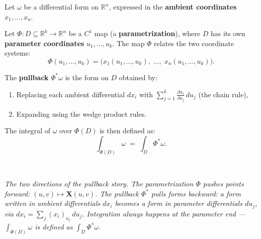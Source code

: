 \documentclass[11pt]{report}
\newcommand{\figcap}[1]{\\[1.5mm]\parbox{0.92\textwidth}{\small\itshape #1}}
\newcommand{\R}{\mathbb{R}}
\newcommand{\parti}[2]{\frac{\partial #1}{\partial #2}}
\begin{document}
\begin{definition}[Pullback]
Let $\omega$ be a differential form on $\R^n$, expressed in the \textbf{ambient coordinates} $x_1, \ldots, x_n$.

Let $\Phi: D \subseteq \R^k \to \R^n$ be a $C^1$ map (a \textbf{parametrization}), where $D$ has its own \textbf{parameter coordinates} $u_1, \ldots, u_k$. The map $\Phi$ relates the two coordinate systems:
\[
\Phi(u_1, \ldots, u_k) = \big(x_1(u_1, \ldots, u_k),\; \ldots,\; x_n(u_1, \ldots, u_k)\big).
\]

The \textbf{pullback} $\Phi^*\omega$ is the form on $D$ obtained by:
\begin{enumerate}
    \item Replacing each ambient differential $dx_i$ with $\displaystyle\sum_{j=1}^k \parti{x_i}{u_j}\,du_j$ (the chain rule),
    \item Expanding using the wedge product rules.
\end{enumerate}

The integral of $\omega$ over $\Phi(D)$ is then defined as:
\[
\int_{\Phi(D)} \omega \;=\; \int_D \Phi^*\omega.
\]
\end{definition}

\begin{center}
%
\figcap{The two directions of the pullback story. The parametrization $\Phi$ pushes points forward: $(u,v) \mapsto \mathbf{X}(u,v)$. The pullback $\Phi^*$ pulls forms backward: a form written in ambient differentials $dx_i$ becomes a form in parameter differentials $du_j$, via $dx_i = \sum_j (x_i)_{u_j}\,du_j$. Integration always happens at the parameter end --- $\int_{\Phi(D)}\omega$ is \textnormal{defined} as $\int_D \Phi^*\omega$.}
\end{center}
\end{document}

